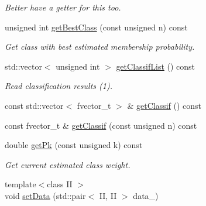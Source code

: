 \begin{DoxyCompactItemize}
\begin{DoxyCompactList}\small\item\em Better have a getter for this too. \item\end{DoxyCompactList}\item 
unsigned int \hyperlink{classCDA_1_1FitMulticlassByEM_a60164ed52d11dc10b4faee5de96d42a7}{getBestClass} (const unsigned n) const 
\begin{DoxyCompactList}\small\item\em Get class with best estimated membership probability. \item\end{DoxyCompactList}\item 
std::vector$<$ unsigned int $>$ \hyperlink{classCDA_1_1FitMulticlassByEM_a915e6a0aaae5f74c5802b53fbed8278a}{getClassifList} () const 
\begin{DoxyCompactList}\small\item\em Read classification results (1). \item\end{DoxyCompactList}\item 
const std::vector$<$ fvector\_\-t $>$ \& \hyperlink{classCDA_1_1FitMulticlassByEM_ad468afb0c45474a7400fd7efbb1ad2dd}{getClassif} () const 
\item 
const fvector\_\-t \& \hyperlink{classCDA_1_1FitMulticlassByEM_addcc14007ec1f00046391c3ac7572e34}{getClassif} (const unsigned n) const 
\item 
double \hyperlink{classCDA_1_1FitMulticlassByEM_a869530b76ee4b40d38d3fb80ea0932aa}{getPk} (const unsigned k) const 
\begin{DoxyCompactList}\small\item\em Get current estimated class weight. \item\end{DoxyCompactList}\item 
\hypertarget{classCDA_1_1FitMulticlassByEM_a7247bfcad3c828f9cf372b6c414e93f0}{
{\footnotesize template$<$class II $>$ }\\void \hyperlink{classCDA_1_1FitMulticlassByEM_a7247bfcad3c828f9cf372b6c414e93f0}{setData} (std::pair$<$ II, II $>$ data\_\-)}
\label{classCDA_1_1FitMulticlassByEM_a7247bfcad3c828f9cf372b6c414e93f0}


\end{DoxyCompactItemize}
